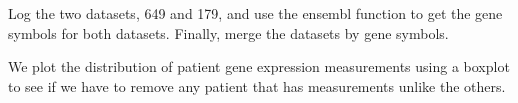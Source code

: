 \documentclass[a4paper,9pt,twocolumn,twoside,]{pinp}
\begin{document}
Log the two datasets, 649 and 179, and use the ensembl function to get
the gene symbols for both datasets. Finally, merge the datasets by gene
symbols.

\begin{Shaded}
\begin{Highlighting}[]
\NormalTok{ <-}\StringTok{ }\NormalTok{)}
\NormalTok{[log_} \OperatorTok{==}\StringTok{ }\OperatorTok{-}\NormalTok{] <-}\StringTok{ }
\StringTok{ }\NormalTok{)}

\NormalTok{ <-}\StringTok{ }\NormalTok{)}
\NormalTok{[log_} \OperatorTok{==}\StringTok{ }\OperatorTok{-}\NormalTok{] <-}\StringTok{ }
\StringTok{ }\NormalTok{)}

\StringTok{ }
 \NormalTok{, }
     \NormalTok{, }
     \NormalTok{)}
\end{Highlighting}
\end{Shaded}

We plot the distribution of patient gene expression measurements using a
boxplot to see if we have to remove any patient that has measurements
unlike the others.
\end{document}
